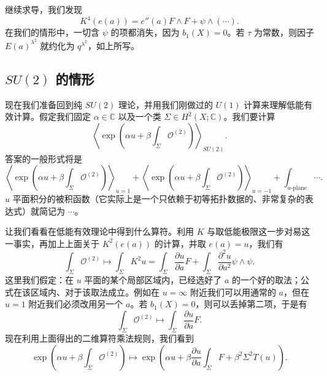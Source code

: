 继续求导，我们发现
\[
K^4(e(a))=e''(a)F\wedge F+\psi\wedge(\cdots).
\]
在我们的情形中，一切含 $\psi$ 的项都消失，因为 $b_1(X)=0$。若 $\tau$ 为常数，则因子 $E(a)^{\lambda^2}$ 就约化为 $q^{\lambda^2}$，如上所写。


\subsection{$SU(2)$ 的情形}

现在我们准备回到纯 $SU(2)$ 理论，并用我们刚做过的 $U(1)$ 计算来理解低能有效计算。假定我们固定 $\alpha\in\mathbb{C}$ 以及一个类 $\Sigma\in H^2(X;\mathbb{C})$。我们要计算
\[
\left\langle\exp\left(\alpha u+\beta\int_\Sigma\mathcal{O}^{(2)}\right)\right\rangle_{SU(2)}.
\]
答案的一般形式将是
\[
\left\langle\exp\left(\alpha u+\beta\int_\Sigma\mathcal{O}^{(2)}\right)\right\rangle_{u=1}
+\left\langle\exp\left(\alpha u+\beta\int_\Sigma\mathcal{O}^{(2)}\right)\right\rangle_{u=-1}
+\int_{u\text{-plane}}\cdots.
\]
$u$ 平面积分的被积函数（它实际上是一个只依赖于初等拓扑数据的、非常复杂的表达式）就简记为 $\cdots$。

让我们看看在低能有效理论中得到什么算符。利用 $K$ 与取低能极限这一步对易这一事实，再加上上面关于 $K^2(e(a))$ 的计算，并取 $e(a)=u$，我们有
\[
\int_\Sigma\mathcal{O}^{(2)}\mapsto\int_\Sigma K^2u=\int_\Sigma\frac{\partial u}{\partial a}F+\int_\Sigma\frac{\partial^2u}{\partial a^2}\psi\wedge\psi.
\]
这里我们假定：在 $u$ 平面的某个局部区域内，已经选好了 $a$ 的一个好的取法；公式在该区域内、对于该取法成立。例如在 $u=\infty$ 附近我们可以用通常的 $a$，但在 $u=1$ 附近我们必须改用另一个 $a$。若 $b_1(X)=0$，则可以丢掉第二项，于是有
\[
\int_\Sigma\mathcal{O}^{(2)}\mapsto\int_\Sigma\frac{\partial u}{\partial a}F.
\]
现在利用上面得出的二维算符乘法规则，我们看到
\[
\exp\left(\alpha u+\beta\int_\Sigma\mathcal{O}^{(2)}\right)
\mapsto\exp\left(\alpha u+\beta\frac{\partial u}{\partial a}\int_\Sigma F+\beta^2\Sigma^2T(u)\right).
\]

